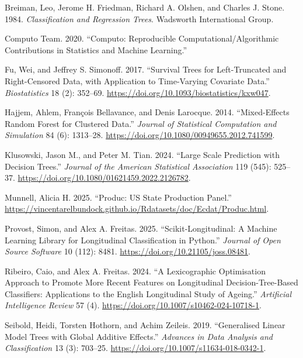 \documentclass[
]{article}
\newlength{\cslhangindent}
\newenvironment{CSLReferences}[2] %
 {\begin{list}{}{%
  \setlength{\itemindent}{0pt}
  \setlength{\leftmargin}{0pt}
  \setlength{\parsep}{0pt}
  \ifodd #1
   \setlength{\leftmargin}{\cslhangindent}
   \setlength{\itemindent}{-1\cslhangindent}
  \fi
  \setlength{\itemsep}{#2\baselineskip}}}
 {\end{list}}
\begin{document}
\label{refs}
\begin{CSLReferences}{1}{0}
Breiman, Leo, Jerome H. Friedman, Richard A. Olshen, and Charles J.
Stone. 1984. \emph{Classification and Regression Trees}. Wadsworth
International Group.

Computo Team. 2020. {``Computo: Reproducible Computational/Algorithmic
Contributions in Statistics and Machine Learning.''}

Fu, Wei, and Jeffrey S. Simonoff. 2017. {``Survival Trees for
Left-Truncated and Right-Censored Data, with Application to Time-Varying
Covariate Data.''} \emph{Biostatistics} 18 (2): 352--69.
\url{https://doi.org/10.1093/biostatistics/kxw047}.

Hajjem, Ahlem, François Bellavance, and Denis Larocque. 2014.
{``Mixed-Effects Random Forest for Clustered Data.''} \emph{Journal of
Statistical Computation and Simulation} 84 (6): 1313--28.
\url{https://doi.org/10.1080/00949655.2012.741599}.

Klusowski, Jason M., and Peter M. Tian. 2024. {``Large Scale Prediction
with Decision Trees.''} \emph{Journal of the American Statistical
Association} 119 (545): 525--37.
\url{https://doi.org/10.1080/01621459.2022.2126782}.

Munnell, Alicia H. 2025. {``Produc: US State Production Panel.''}
\url{https://vincentarelbundock.github.io/Rdatasets/doc/Ecdat/Produc.html}.

Provost, Simon, and Alex A. Freitas. 2025. {``Scikit-Longitudinal: A
Machine Learning Library for Longitudinal Classification in Python.''}
\emph{Journal of Open Source Software} 10 (112): 8481.
\url{https://doi.org/10.21105/joss.08481}.

Ribeiro, Caio, and Alex A. Freitas. 2024. {``A Lexicographic
Optimisation Approach to Promote More Recent Features on Longitudinal
Decision-Tree-Based Classifiers: Applications to the English
Longitudinal Study of Ageing.''} \emph{Artificial Intelligence Review}
57 (4). \url{https://doi.org/10.1007/s10462-024-10718-1}.

Seibold, Heidi, Torsten Hothorn, and Achim Zeileis. 2019. {``Generalised
Linear Model Trees with Global Additive Effects.''} \emph{Advances in
Data Analysis and Classification} 13 (3): 703--25.
\url{https://doi.org/10.1007/s11634-018-0342-1}.


\end{CSLReferences}
\end{document}
